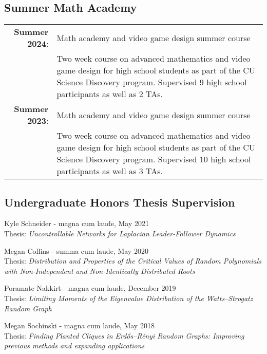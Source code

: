 \documentclass[letterpaper]{article}
\renewenvironment{itemize}{
  \begin{list}{}{
    \setlength{\leftmargin}{1em}
  }
}{
  \end{list}
}
\begin{document}
\subsection*{Summer Math Academy}
 \begin{tabular}{r p{4.65in}}
   {\bf Summer 2024}: & Math academy and video game design summer course \\
   & Two week course on advanced mathematics and video game design for high school students as part of the CU Science Discovery program.   Supervised $9$ high school participants as well as $2$ TAs.  \\
   {\bf Summer 2023}: & Math academy and video game design summer course \\
   & Two week course on advanced mathematics and video game design for high school students as part of the CU Science Discovery program.   Supervised $10$ high school participants as well as $3$ TAs. 
   \end{tabular}
   
\subsection*{Undergraduate Honors Thesis Supervision}
\begin{itemize}
	\item Kyle Schneider - magna cum laude, May 2021 \\
	Thesis: \textit{Uncontrollable Networks for Laplacian Leader-Follower Dynamics}
	\item Megan Collins - summa cum laude, May 2020 \\
	Thesis: \textit{Distribution and Properties of the Critical Values of Random Polynomials with Non-Independent and Non-Identically Distributed Roots}
	\item Poramate Nakkirt - magna cum laude, December 2019 \\
	Thesis: \textit{Limiting Moments of the Eigenvalue Distribution of the Watts--Strogatz Random Graph}
	\item Megan Sochinski - magna cum laude, May 2018 \\  
	Thesis: \textit{Finding Planted Cliques in Erd\H{o}s--R\'{e}nyi Random Graphs: Improving previous methods and expanding applications} 
\end{itemize}
\end{document}
